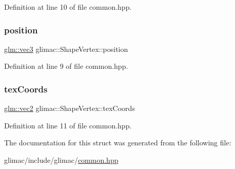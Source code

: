 Definition at line 10 of file common.\+hpp.

\mbox{\label{structglimac_1_1_shape_vertex_a727bc4adace4f00e47069ce7373e3b97}} 
\subsubsection{\texorpdfstring{position}{position}}
{\footnotesize\ttfamily \hyperlink{group__core__types_ga1c47e8b3386109bc992b6c48e91b0be7}{glm\+::vec3} glimac\+::\+Shape\+Vertex\+::position}



Definition at line 9 of file common.\+hpp.

\mbox{\label{structglimac_1_1_shape_vertex_ab694e76716c4cdc5e8636325b5fbeee2}} 
\subsubsection{\texorpdfstring{tex\+Coords}{texCoords}}
{\footnotesize\ttfamily \hyperlink{group__core__types_gaa1618f51db67eaa145db101d8c8431d8}{glm\+::vec2} glimac\+::\+Shape\+Vertex\+::tex\+Coords}



Definition at line 11 of file common.\+hpp.



The documentation for this struct was generated from the following file\+:\begin{DoxyCompactItemize}
\item 
glimac/include/glimac/\hyperlink{glimac_2include_2glimac_2common_8hpp}{common.\+hpp}\end{DoxyCompactItemize}
